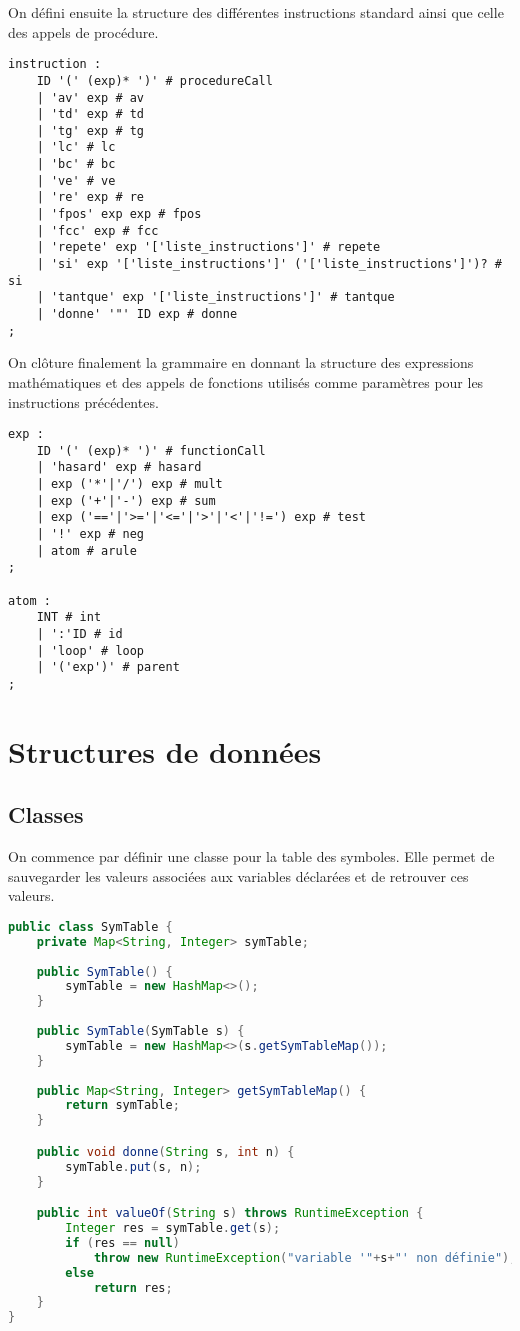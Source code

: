 \documentclass[a4paper,11pt]{article}
\begin{document}
On défini ensuite la structure des différentes instructions standard ainsi que celle des appels de procédure.
\begin{lstlisting}
instruction :
    ID '(' (exp)* ')' # procedureCall
    | 'av' exp # av
    | 'td' exp # td
    | 'tg' exp # tg
    | 'lc' # lc
    | 'bc' # bc
    | 've' # ve
    | 're' exp # re
    | 'fpos' exp exp # fpos
    | 'fcc' exp # fcc
    | 'repete' exp '['liste_instructions']' # repete
    | 'si' exp '['liste_instructions']' ('['liste_instructions']')? # si
    | 'tantque' exp '['liste_instructions']' # tantque
    | 'donne' '"' ID exp # donne
;
\end{lstlisting}

On clôture finalement la grammaire en donnant la structure des expressions mathématiques et des appels de fonctions utilisés comme paramètres pour les instructions précédentes.
\begin{lstlisting}
exp :
    ID '(' (exp)* ')' # functionCall
    | 'hasard' exp # hasard
    | exp ('*'|'/') exp # mult
    | exp ('+'|'-') exp # sum
    | exp ('=='|'>='|'<='|'>'|'<'|'!=') exp # test
    | '!' exp # neg
    | atom # arule
;

atom :
    INT # int
    | ':'ID # id
    | 'loop' # loop
    | '('exp')' # parent
;
\end{lstlisting}

\section{Structures de données}
\subsection{Classes}
On commence par définir une classe pour la table des symboles.
Elle permet de sauvegarder les valeurs associées aux variables déclarées et de retrouver ces valeurs.
\begin{lstlisting}[language=Java]
public class SymTable {
    private Map<String, Integer> symTable;
    
    public SymTable() {
        symTable = new HashMap<>();
    }
    
    public SymTable(SymTable s) {
        symTable = new HashMap<>(s.getSymTableMap());
    }
    
    public Map<String, Integer> getSymTableMap() {
        return symTable;
    }

    public void donne(String s, int n) {
        symTable.put(s, n);
    }

    public int valueOf(String s) throws RuntimeException {
        Integer res = symTable.get(s);
        if (res == null)
            throw new RuntimeException("variable '"+s+"' non définie");
        else
            return res;
    }
}
\end{lstlisting}
\end{document}
